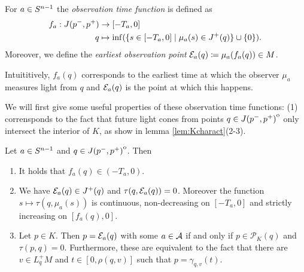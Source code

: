 \begin{definition}\label{def:observationtime}
For $a\in {S^{n-1}}$ the \emph{observation time function} 
is defined as 
\begin{align*}
    f_a:J(p^-,p^+)&\to [-T_a,0]\\
    q&\mapsto\inf(\{s\in [-T_a,0] \mid \mu_a(s)\in J^+(q)\}\cup \{0\}).
\end{align*}
Moreover, we define the \emph{earliest observation point} ${\mathcal{E}}_a(q)\coloneqq\mu_a(f_a(q))\in M$. 

Intuititively, $f_a(q)$ corresponds to the earliest time at which the observer $\mu_a$ measures light from $q$ and ${\mathcal{E}}_a(q)$ is the point at which this happens.
\end{definition}

We will first give some useful properties of these observation time functions: (1) corrensponds to the fact that future light cones from points $q\in {\kern0ptJ(p^-,p^+)}^{\mathrm{o}}$ only intersect the interior of $K$, as show in lemma \ref{lem:Kcharact}(2-3).
\begin{lemma}\label{lem:observationtime}
Let $a\in {S^{n-1}}$ and $q \in {\kern0ptJ(p^-,p^+)}^{\mathrm{o}}$. Then
\begin{enumerate}[label={\textnormal{(\arabic*)}}]
    \item It holds that $f_a(q)\in (-T_a,0)$.
    \item We have ${\mathcal{E}}_a(q)\in J^+(q)$ and $\tau(q,{\mathcal{E}}_a(q))=0$. Moreover the function $s\mapsto\tau(q,\mu_a(s))$ is continuous, non-decreasing on $[-T_a,0]$ and strictly increasing on $[f_a(q),0]$.
    \item Let $p\in K$. Then $p={\mathcal{E}}_a(q)$ with some $a\in \mathcal{A}$ if and only if $p\in \mathcal{P}_K(q)$ and $\tau(p,q)=0$. Furthermore, these are equivalent to the fact that there are $v\in L^+_qM$ and $t\in[0,\rho(q,v)]$ such that $p=\gamma_{q,v}(t)$.
\end{enumerate}
\end{lemma}
